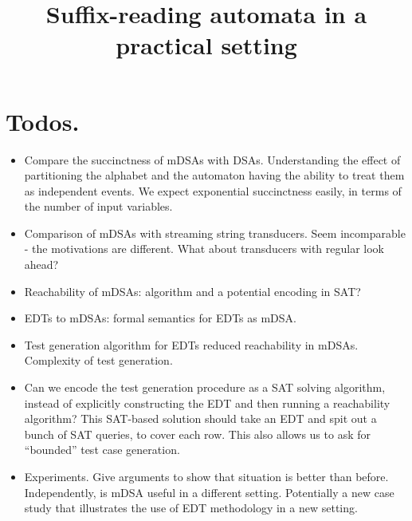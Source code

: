 \documentclass[conference]{IEEEtran}
\begin{document}
\title{Suffix-reading automata in a practical setting}

\maketitle



\section{Todos.}

\begin{itemize}
\item Compare the succinctness of mDSAs with DSAs. Understanding the
  effect of partitioning the alphabet and the automaton having the
  ability to treat them as independent events. We expect exponential
  succinctness easily, in terms of the number of input variables.

\item Comparison of mDSAs with streaming string transducers. Seem
  incomparable - the motivations are different. What about transducers
  with regular look ahead? 

\item Reachability of mDSAs: algorithm and a potential encoding in
  SAT?
  
\item EDTs to mDSAs: formal semantics for EDTs as mDSA. 

\item Test generation algorithm for EDTs reduced reachability in
  mDSAs. Complexity of test generation. 

\item Can we encode the test generation procedure as a SAT solving
  algorithm, instead of explicitly constructing the EDT and then
  running a reachability algorithm? This SAT-based solution should
  take an EDT and spit out a bunch of SAT queries, to cover each
  row. This also allows us to ask for ``bounded'' test case
  generation. 

\item Experiments. Give arguments to show that situation is better
  than before. Independently, is mDSA useful in a different
  setting. Potentially a new case study that illustrates the use of
  EDT methodology in a new setting.  
  
\end{itemize}



\end{document}
